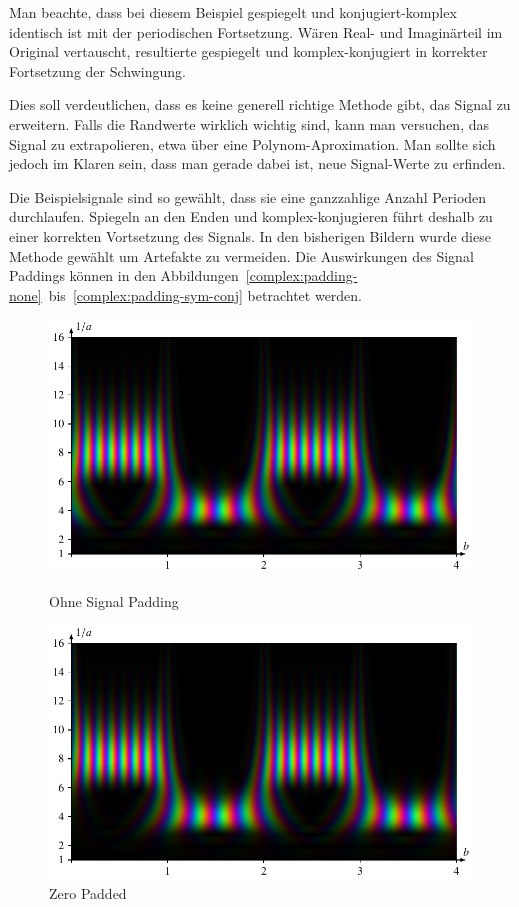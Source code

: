 Man beachte, dass bei diesem Beispiel gespiegelt und konjugiert-komplex identisch ist mit der periodischen Fortsetzung.
Wären Real- und Imaginärteil im Original vertauscht, resultierte gespiegelt und komplex-konjugiert in korrekter Fortsetzung der Schwingung.

Dies soll verdeutlichen, dass es keine generell richtige Methode gibt, das Signal zu erweitern.
Falls die Randwerte wirklich wichtig sind, kann man versuchen, das Signal zu extrapolieren, etwa über eine Polynom-Aproximation.
Man sollte sich jedoch im Klaren sein, dass man gerade dabei ist, neue Signal-Werte zu erfinden.

Die Beispielsignale sind so gewählt, dass sie eine ganzzahlige Anzahl Perioden durchlaufen. 
Spiegeln an den Enden und komplex-konjugieren führt deshalb zu einer korrekten Vortsetzung des Signals.
In den bisherigen Bildern wurde diese Methode gewählt um Artefakte zu vermeiden.
Die Auswirkungen des Signal Paddings können in den Abbildungen~\ref{complex:padding-none}~bis~\ref{complex:padding-sym-conj} betrachtet werden.
\begin{figure}
	\centering
	\includegraphics[width=\linewidth, keepaspectratio]{papers/complex/images/padding_none.pdf}
	\caption{Ohne Signal Padding} \label{complex:padding-none}
	\includegraphics[width=\linewidth, keepaspectratio]{papers/complex/images/padding_zero.pdf}
	\caption{Zero Padded} \label{complex:padding-zero}
\end{figure}
